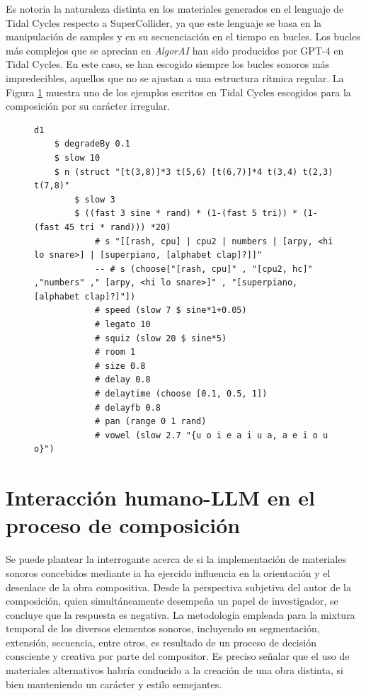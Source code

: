 Es notoria la naturaleza distinta en los materiales generados en el lenguaje de Tidal Cycles respecto a SuperCollider, ya que este lenguaje se basa en la manipulación de samples y en su secuenciación en el tiempo en bucles. Los bucles más complejos que se aprecian en \emph{AlgorAI} han sido producidos por GPT-4 en Tidal Cycles. En este caso, se han escogido siempre los bucles sonoros más impredecibles, aquellos que no se ajustan a una estructura rítmica regular. La Figura \ref{fig:ejemplo_tidal_irregular} muestra uno de los ejemplos escritos en Tidal Cycles escogidos para la composición por su carácter irregular.


\begin{figure}[H]
    \centering
    \begin{lstlisting}[style=SuperCollider-IDE, basicstyle=\footnotesize\ttfamily, numbers=none]
d1 
    $ degradeBy 0.1
    $ slow 10 
    $ n (struct "[t(3,8)]*3 t(5,6) [t(6,7)]*4 t(3,4) t(2,3) t(7,8)"
        $ slow 3 
        $ ((fast 3 sine * rand) * (1-(fast 5 tri)) * (1-(fast 45 tri * rand))) *20) 
            # s "[[rash, cpu] | cpu2 | numbers | [arpy, <hi lo snare>] | [superpiano, [alphabet clap]?]]" 
            -- # s (choose["[rash, cpu]" , "[cpu2, hc]" ,"numbers" ," [arpy, <hi lo snare>]" , "[superpiano, [alphabet clap]?]"])
            # speed (slow 7 $ sine*1+0.05) 
            # legato 10
            # squiz (slow 20 $ sine*5)
            # room 1
            # size 0.8
            # delay 0.8
            # delaytime (choose [0.1, 0.5, 1])
            # delayfb 0.8
            # pan (range 0 1 rand)
            # vowel (slow 2.7 "{u o i e a i u a, a e i o u o}")
    \end{lstlisting}
    \source{\propio}
    \label{fig:ejemplo_tidal_irregular}
\end{figure}

\section{Interacción humano-LLM en el proceso de composición}

Se puede plantear la interrogante acerca de si la implementación de materiales sonoros concebidos mediante \gls{ia} ha ejercido influencia en la orientación y el desenlace de la obra compositiva. Desde la perspectiva subjetiva del autor de la composición, quien simultáneamente desempeña un papel de investigador, se concluye que la respuesta es negativa. La metodología empleada para la mixtura temporal de los diversos elementos sonoros, incluyendo su segmentación, extensión, secuencia, entre otros, es resultado de un proceso de decisión consciente y creativa por parte del compositor. Es preciso señalar que el uso de materiales alternativos habría conducido a la creación de una obra distinta, si bien manteniendo un carácter y estilo semejantes.

